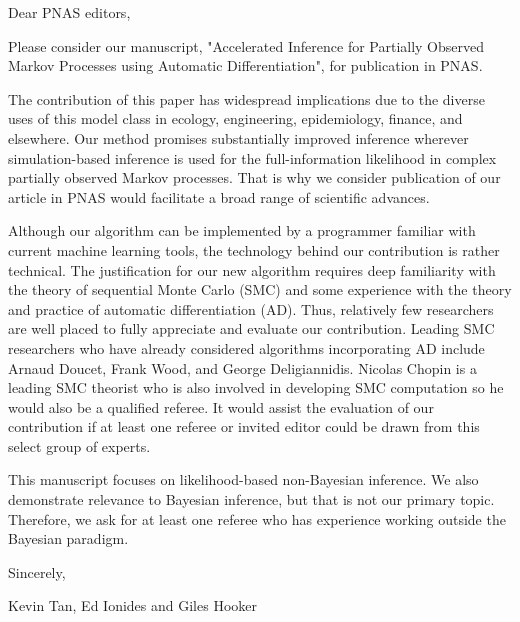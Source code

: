 \documentclass[11pt]{article}
\begin{document}
\noindent Dear PNAS editors,
\newline

Please consider our manuscript, "Accelerated Inference for Partially Observed Markov Processes using Automatic Differentiation", for publication in PNAS.

The contribution of this paper has widespread implications due to the diverse uses of this model class in ecology, engineering, epidemiology, finance, and elsewhere. Our method promises substantially improved inference wherever simulation-based inference is used for the full-information likelihood in complex partially observed Markov processes. That is why we consider publication of our article in PNAS would facilitate a broad range of scientific advances. 

Although our algorithm can be implemented by a programmer familiar with current machine learning tools, the technology behind our contribution is rather technical. The justification for our new algorithm requires deep familiarity with the theory of sequential Monte Carlo (SMC) and some experience with the theory and practice of automatic differentiation (AD). Thus, relatively few researchers are well placed to fully appreciate and evaluate our contribution. Leading SMC researchers who have already considered algorithms incorporating AD include Arnaud Doucet, Frank Wood, and George Deligiannidis. Nicolas Chopin is a leading SMC theorist who is also involved in developing SMC computation so he would also be a qualified referee. It would assist the evaluation of our contribution if at least one referee or invited editor could be drawn from this select group of experts.

This manuscript focuses on likelihood-based non-Bayesian inference. We also demonstrate relevance to Bayesian inference, but that is not our primary topic. Therefore, we ask for at least one referee who has experience working outside the Bayesian paradigm.

\vspace{3ex}

\noindent Sincerely,

\noindent Kevin Tan, Ed Ionides and Giles Hooker
\end{document}
